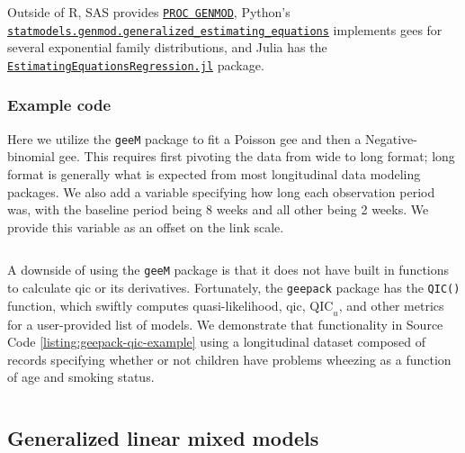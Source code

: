 \documentclass{report}
\begin{document}
Outside of R, SAS provides \href{https://support.sas.com/documentation/cdl/en/statug/63033/HTML/default/viewer.htm#genmod_toc.htm}{\texttt{PROC GENMOD}}, Python's \href{https://www.statsmodels.org/stable/gee.html}{\texttt{statmodels.genmod.generalized\_estimating\_equations}} implements \glspl{gee} for several exponential family distributions, and Julia has the \href{https://github.com/kshedden/EstimatingEquationsRegression.jl}{\texttt{EstimatingEquationsRegression.jl}} package. 

\subsubsection{Example code}

Here we utilize the \texttt{geeM} package to fit a Poisson \gls{gee} and then a Negative-binomial \gls{gee}. This requires first pivoting the data from wide to long format; long format is generally what is expected from most longitudinal data modeling packages. We also add a variable specifying how long each observation period was, with the baseline period being 8 weeks and all other being 2 weeks. We provide this variable as an offset on the link scale. 

\begin{listing}[h!]
\inputminted{r}{Example-Code/geem_count_regression.R}
\caption{Fitting Poisson and Negative-binomial GEEs to the seizures dataset using \texttt{geeM}.}
\label{listing:geem-example}
\end{listing}

A downside of using the \texttt{geeM} package is that it does not have built in functions to calculate \gls{qic} or its derivatives. Fortunately, the \texttt{geepack} package has the \texttt{QIC()} function, which swiftly computes quasi-likelihood, \gls{qic}, $\text{QIC}_u$, and other metrics for a user-provided list of models. We demonstrate that functionality in Source Code \ref{listing:geepack-qic-example} using a longitudinal dataset composed of records specifying whether or not children have problems wheezing as a function of age and smoking status. 

\begin{listing}[h!]
\inputminted{r}{Example-Code/geepack_qic.R}
\caption{Choosing between correlation structures using QIC as implemented in \texttt{geepack}.}
\label{listing:geepack-qic-example}
\end{listing}

\subsection{Generalized linear mixed models}
\end{document}
